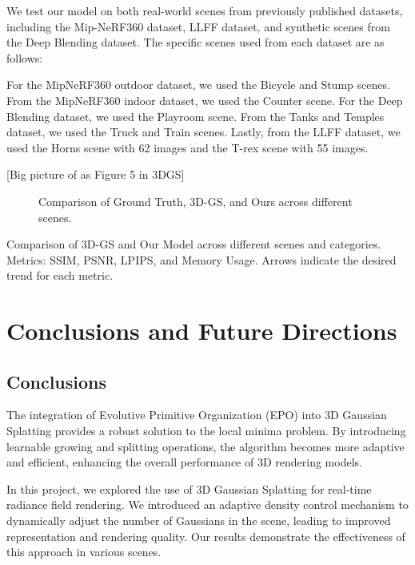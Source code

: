 \documentclass[11pt]{report}
\begin{document}
We test our model on both real-world scenes from previously published datasets, including the Mip-NeRF360 dataset, LLFF dataset, and synthetic scenes from the Deep Blending dataset. The specific scenes used from each dataset are as follows: 

For the MipNeRF360 outdoor dataset, we used the Bicycle and Stump scenes. From the MipNeRF360 indoor dataset, we used the Counter scene. For the Deep Blending dataset, we used the Playroom scene. From the Tanks and Temples dataset, we used the Truck and Train scenes. Lastly, from the LLFF dataset, we used the Horns scene with 62 images and the T-rex scene with 55 images.

[Big picture of as Figure 5 in 3DGS]

\begin{figure}[H]
    \centering
    
    \caption{Comparison of Ground Truth, 3D-GS, and Ours across different scenes.}
    \label{fig:comparison}
\end{figure}

\begin{table}[h!]
    \centering
    
    \caption{Comparison of 3D-GS and Our Model across different scenes and categories. Metrics: SSIM, PSNR, LPIPS, and Memory Usage. Arrows indicate the desired trend for each metric.}
    \label{tab:comparison}
    \end{table}

\chapter{Conclusions and Future Directions}

\section{Conclusions}

The integration of Evolutive Primitive Organization (EPO) into 3D Gaussian Splatting provides a robust solution to the local minima problem. By introducing learnable growing and splitting operations, the algorithm becomes more adaptive and efficient, enhancing the overall performance of 3D rendering models.

In this project, we explored the use of 3D Gaussian Splatting for real-time radiance field rendering. We introduced an adaptive density control mechanism to dynamically adjust the number of Gaussians in the scene, leading to improved representation and rendering quality. Our results demonstrate the effectiveness of this approach in various scenes.
\end{document}
